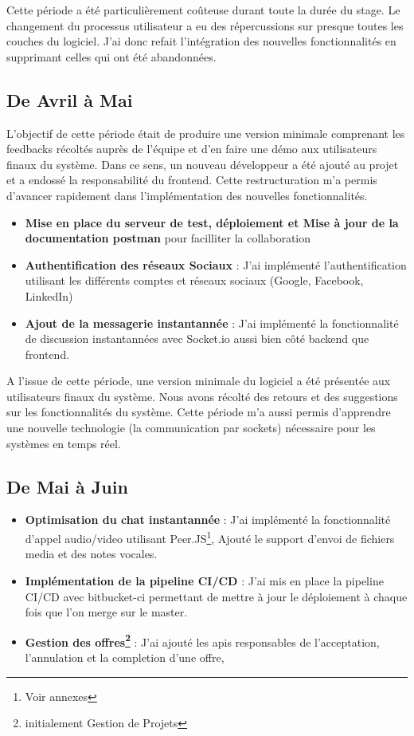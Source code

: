 \vspace{1cm}
Cette période a été particulièrement coûteuse durant toute la durée du stage. Le changement du processus utilisateur a eu des répercussions sur presque toutes les couches du logiciel. J'ai donc refait l'intégration des nouvelles fonctionnalités en supprimant celles qui ont été abandonnées.

\subsection*{De Avril à Mai}

L'objectif de cette période était de produire une version minimale comprenant les feedbacks récoltés auprès de l'équipe et d'en faire une démo aux utilisateurs finaux du système. Dans ce sens, un nouveau développeur a été ajouté au projet et a endossé la responsabilité du frontend. Cette restructuration m'a permis d'avancer rapidement dans l'implémentation des nouvelles fonctionnalités.\\

\begin{itemize}
    \item \textbf{Mise en place du serveur de test, déploiement et Mise à jour de la documentation postman}  pour facilliter la collaboration
    \item \textbf{Authentification des réseaux Sociaux} : J'ai implémenté l'authentification utilisant les différents comptes et réseaux sociaux (Google, Facebook, LinkedIn)
    \item \textbf{Ajout de la messagerie instantannée} : J'ai implémenté la fonctionnalité de discussion instantannées avec Socket.io aussi bien côté backend que frontend.
\end{itemize}
\vspace{1cm}

A l'issue de cette période, une version minimale du logiciel a été présentée aux utilisateurs finaux du système. Nous avons récolté des retours et des suggestions sur les fonctionnalités du système. 
Cette période m'a aussi permis d'apprendre une nouvelle technologie (la communication par sockets) nécessaire pour les systèmes en temps réel. 

\subsection*{De Mai à Juin}

\begin{itemize}
    \item \textbf{Optimisation du chat instantannée} : J'ai implémenté la fonctionnalité d'appel audio/video utilisant Peer.JS\footnote{Voir annexes}, Ajouté le support d'envoi de fichiers media et des notes vocales. 
    \item \textbf{Implémentation de la pipeline CI/CD} : J'ai mis en place la pipeline CI/CD avec bitbucket-ci permettant de mettre à jour le déploiement à chaque fois que l'on merge sur le master.
    \item \textbf{Gestion des offres\footnote{initialement Gestion de Projets}} : J'ai ajouté les apis responsables de l'acceptation, l'annulation et la completion d'une offre, 
\end{itemize}

